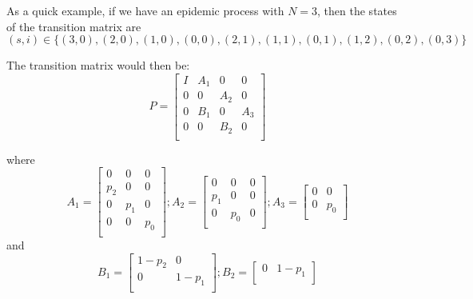 \documentclass[reqno,11pt]{amsart}
\begin{document}
As a quick example, if we have an epidemic process with $N=3$, then the states of the transition matrix are
\begin{equation*}
(s,i) \in \lbrace (3,0),(2,0),(1,0),(0,0),(2,1),(1,1),(0,1),(1,2),(0,2),(0,3)    \rbrace
\end{equation*}

The transition matrix would then be:
\begin{equation}
P = 
\begin{bmatrix}
I&    	A_1&     	0&     		0     		 		\\
0&    	0&        	A_2& 		0 		 		\\
0& 	B_1& 		0& 		A_3  		 		\\
0& 	0& 		B_2& 		0 			\\
\end{bmatrix}
\end{equation}

where
\begin{equation}
A_1 = 
\begin{bmatrix}
0&    	0&     		0     		     		 		\\
p_2&    0&        	0 		 		 		\\
0& 	p_1& 		0 		  		 		\\
0& 	0& 		p_0 		  			\\
\end{bmatrix};
A_2 = 
\begin{bmatrix}
0&    	0&     		0     		     		 		\\
p_1&    0&        	0 		 		 		\\
0& 	p_0& 		0 		  		 		\\
\end{bmatrix};
A_3 =
\begin{bmatrix}
0&    	0    		     		 		\\
0&         p_0						\\
\end{bmatrix}
\end{equation}
and
\begin{equation}
B_1 = 
\begin{bmatrix}
1-p_2&    0        	\\
0& 	1-p_1 		\\
\end{bmatrix};
B_2 = 
\begin{bmatrix}
0& 	1-p_1          	\\
\end{bmatrix}
\end{equation}
%
%
%
%
\end{document}
